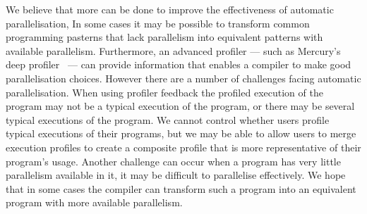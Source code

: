 We believe that more can be done to improve the effectiveness of
automatic parallelisation,
In some cases it may be possible to transform common programming
pasterns that lack parallelism into equivalent patterns with available
parallelism.
Furthermore, an advanced profiler --- such as Mercury's deep
profiler~\citep{conway:2001:mercury-deep} --- can provide information
that enables a compiler to make good parallelisation choices.
However there are a number of challenges facing automatic
parallelisation.
When using profiler feedback the profiled execution of the program may
not be a typical execution of the program, or there may be several
typical executions of the program.
We cannot control whether users profile typical executions of their
programs, but we may be able to allow users to merge execution
profiles to create a composite profile that is more representative of
their program's usage.
Another challenge can occur when a program has very little parallelism
available in it, it may be difficult to parallelise effectively.
We hope that in some cases the compiler can transform such a program
into an equivalent program with more available parallelism.

%
